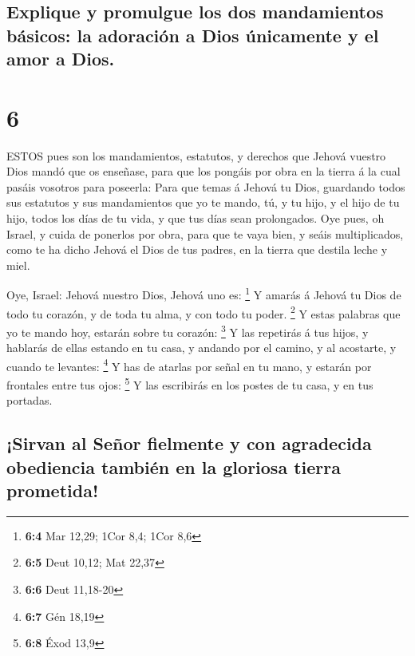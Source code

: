 \hypertarget{explique-y-promulgue-los-dos-mandamientos-buxe1sicos-la-adoraciuxf3n-a-dios-uxfanicamente-y-el-amor-a-dios.}{%
\subsection{Explique y promulgue los dos mandamientos básicos: la
adoración a Dios únicamente y el amor a
Dios.}\label{explique-y-promulgue-los-dos-mandamientos-buxe1sicos-la-adoraciuxf3n-a-dios-uxfanicamente-y-el-amor-a-dios.}}

\hypertarget{section-5}{%
\section{6}\label{section-5}}

 ESTOS pues son los mandamientos, estatutos, y derechos que
Jehová vuestro Dios mandó que os enseñase, para que los pongáis por obra
en la tierra á la cual pasáis vosotros para poseerla:  Para
que temas á Jehová tu Dios, guardando todos sus estatutos y sus
mandamientos que yo te mando, tú, y tu hijo, y el hijo de tu hijo, todos
los días de tu vida, y que tus días sean prolongados.  Oye
pues, oh Israel, y cuida de ponerlos por obra, para que te vaya bien, y
seáis multiplicados, como te ha dicho Jehová el Dios de tus padres, en
la tierra que destila leche y miel.

 Oye, Israel: Jehová nuestro Dios, Jehová uno es:
\footnote{\textbf{6:4} Mar 12,29; 1Cor 8,4; 1Cor 8,6}  Y
amarás á Jehová tu Dios de todo tu corazón, y de toda tu alma, y con
todo tu poder. \footnote{\textbf{6:5} Deut 10,12; Mat 22,37}
 Y estas palabras que yo te mando hoy, estarán sobre tu
corazón: \footnote{\textbf{6:6} Deut 11,18-20}  Y las
repetirás á tus hijos, y hablarás de ellas estando en tu casa, y andando
por el camino, y al acostarte, y cuando te levantes: \footnote{\textbf{6:7}
  Gén 18,19}  Y has de atarlas por señal en tu mano, y
estarán por frontales entre tus ojos: \footnote{\textbf{6:8} Éxod 13,9}
 Y las escribirás en los postes de tu casa, y en tus
portadas.

\hypertarget{sirvan-al-seuxf1or-fielmente-y-con-agradecida-obediencia-tambiuxe9n-en-la-gloriosa-tierra-prometida}{%
\subsection{¡Sirvan al Señor fielmente y con agradecida obediencia
también en la gloriosa tierra
prometida!}\label{sirvan-al-seuxf1or-fielmente-y-con-agradecida-obediencia-tambiuxe9n-en-la-gloriosa-tierra-prometida}}

